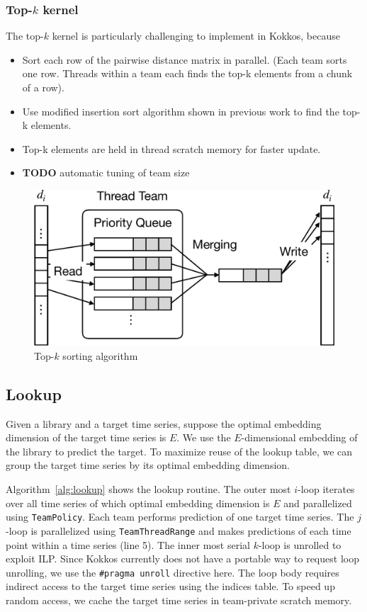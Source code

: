 \documentclass[conference]{IEEEtran}
\begin{document}
\subsubsection{Top-$k$ kernel}

The top-$k$ kernel is particularly challenging to implement in Kokkos, because

\begin{itemize}
\item Sort each row of the pairwise distance matrix in parallel. (Each team sorts one row. Threads within a team each finds the top-k elements from a chunk of a row).
\item Use modified insertion sort algorithm shown in previous work to find the top-k elements.
\item Top-k elements are held in thread scratch memory for faster update.
\item \textbf{TODO} automatic tuning of team size
\end{itemize}

\begin{figure}
    \centering
    \includegraphics[width=.8\columnwidth]{figs/sorting}
    \caption{Top-$k$ sorting algorithm}%
    \label{fig:topk}
\end{figure}

\subsection{Lookup}

Given a library and a target time series, suppose the optimal embedding
dimension of the target time series is $E$. We use the $E$-dimensional embedding
of the library to predict the target. To maximize reuse of the lookup table, we
can group the target time series by its optimal embedding dimension.

Algorithm~\ref{alg:lookup} shows the lookup routine. The outer most $i$-loop
iterates over all time series of which optimal embedding dimension is $E$ and
parallelized using \texttt{TeamPolicy}. Each team performs prediction of one
target time series. The $j$-loop is parallelized using \texttt{TeamThreadRange}
and makes predictions of each time point within a time series (line 5). The
inner most serial $k$-loop is unrolled to exploit ILP\@. Since Kokkos currently
does not have a portable way to request loop unrolling, we use the
\texttt{\#pragma unroll} directive here. The loop body requires indirect access
to the target time series using the indices table. To speed up random access, we
cache the target time series in team-private scratch memory.
\end{document}

